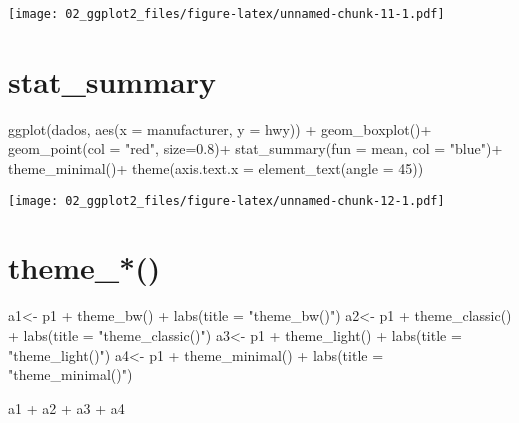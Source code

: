\documentclass[
]{book}
\newenvironment{Shaded}{\begin{snugshade}}{\end{snugshade}}
\newcommand{\AttributeTok}[1]{\textcolor[rgb]{0.77,0.63,0.00}{#1}}
\newcommand{\DecValTok}[1]{\textcolor[rgb]{0.00,0.00,0.81}{#1}}
\newcommand{\FloatTok}[1]{\textcolor[rgb]{0.00,0.00,0.81}{#1}}
\newcommand{\FunctionTok}[1]{\textcolor[rgb]{0.00,0.00,0.00}{#1}}
\newcommand{\NormalTok}[1]{#1}
\newcommand{\OtherTok}[1]{\textcolor[rgb]{0.56,0.35,0.01}{#1}}
\newcommand{\SpecialCharTok}[1]{\textcolor[rgb]{0.00,0.00,0.00}{#1}}
\newcommand{\StringTok}[1]{\textcolor[rgb]{0.31,0.60,0.02}{#1}}
\begin{document}
\texttt{[image: 02\_ggplot2\_files/figure-latex/unnamed-chunk-11-1.pdf]}

\hypertarget{stat_summary}{%
\section{stat\_summary}\label{stat_summary}}

\begin{Shaded}
\begin{Highlighting}[]
\FunctionTok{ggplot}\NormalTok{(dados, }\FunctionTok{aes}\NormalTok{(}\AttributeTok{x =}\NormalTok{ manufacturer, }\AttributeTok{y =}\NormalTok{ hwy)) }\SpecialCharTok{+} 
  \FunctionTok{geom\_boxplot}\NormalTok{()}\SpecialCharTok{+}
  \FunctionTok{geom\_point}\NormalTok{(}\AttributeTok{col =} \StringTok{"red"}\NormalTok{, }\AttributeTok{size=}\FloatTok{0.8}\NormalTok{)}\SpecialCharTok{+}
  \FunctionTok{stat\_summary}\NormalTok{(}\AttributeTok{fun =}\NormalTok{ mean, }\AttributeTok{col =} \StringTok{"blue"}\NormalTok{)}\SpecialCharTok{+}
  \FunctionTok{theme\_minimal}\NormalTok{()}\SpecialCharTok{+}
  \FunctionTok{theme}\NormalTok{(}\AttributeTok{axis.text.x =} \FunctionTok{element\_text}\NormalTok{(}\AttributeTok{angle =} \DecValTok{45}\NormalTok{))}
\end{Highlighting}
\end{Shaded}

\texttt{[image: 02\_ggplot2\_files/figure-latex/unnamed-chunk-12-1.pdf]}

\hypertarget{theme_}{%
\section{theme\_*()}\label{theme_}}

\begin{Shaded}
\begin{Highlighting}[]
\NormalTok{a1}\OtherTok{\textless{}{-}}\NormalTok{ p1 }\SpecialCharTok{+} \FunctionTok{theme\_bw}\NormalTok{() }\SpecialCharTok{+} \FunctionTok{labs}\NormalTok{(}\AttributeTok{title =} \StringTok{"theme\_bw()"}\NormalTok{)}
\NormalTok{a2}\OtherTok{\textless{}{-}}\NormalTok{ p1 }\SpecialCharTok{+} \FunctionTok{theme\_classic}\NormalTok{() }\SpecialCharTok{+} \FunctionTok{labs}\NormalTok{(}\AttributeTok{title =} \StringTok{"theme\_classic()"}\NormalTok{)}
\NormalTok{a3}\OtherTok{\textless{}{-}}\NormalTok{ p1 }\SpecialCharTok{+} \FunctionTok{theme\_light}\NormalTok{() }\SpecialCharTok{+} \FunctionTok{labs}\NormalTok{(}\AttributeTok{title =} \StringTok{"theme\_light()"}\NormalTok{)}
\NormalTok{a4}\OtherTok{\textless{}{-}}\NormalTok{ p1 }\SpecialCharTok{+} \FunctionTok{theme\_minimal}\NormalTok{() }\SpecialCharTok{+} \FunctionTok{labs}\NormalTok{(}\AttributeTok{title =} \StringTok{"theme\_minimal()"}\NormalTok{)}

\NormalTok{a1 }\SpecialCharTok{+}\NormalTok{ a2 }\SpecialCharTok{+}\NormalTok{ a3 }\SpecialCharTok{+}\NormalTok{ a4}
\end{Highlighting}
\end{Shaded}
\end{document}
